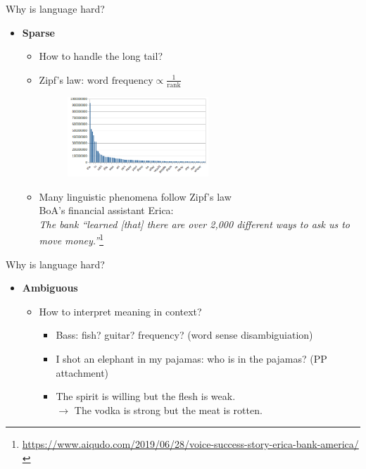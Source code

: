 \documentclass[usenames,dvipsnames,notes,11pt,aspectratio=169]{beamer}
\begin{document}
\begin{frame}
    {Why is language hard?}
    \begin{itemize}
        \item \textbf{Sparse} 
            \begin{itemize}
                \item How to handle the long tail?
                \item Zipf's law: $\text{word frequency} \propto \frac{1}{\text{rank}}$
                    \begin{figure}
                        \includegraphics[height=3cm]{figures/zipf}
                    \end{figure}
                \item Many linguistic phenomena follow Zipf's law\\
                    BoA's financial assistant Erica:\\
                    \textit{The bank ``learned [that] there are over 2,000 different ways to ask us to move money.''}\footnote[frame]{
                        \url{https://www.aiqudo.com/2019/06/28/voice-success-story-erica-bank-america/}
                    }
            \end{itemize}
    \end{itemize}
\end{frame}

\begin{frame}
    {Why is language hard?}
    \begin{itemize}
        \item \textbf{Ambiguous} 
            \begin{itemize}
                \item How to interpret meaning in context?
                \medskip
                \begin{itemize}
                    \itemsep2em
                    \item[] Bass: fish? guitar? frequency? (word sense disambiguiation)
                    \item[] I shot an elephant in my pajamas: who is in the pajamas? (PP attachment)
                    \item[] The spirit is willing but the flesh is weak.\\
                        $\rightarrow$ 
                        The vodka is strong but the meat is rotten.
                \end{itemize}
            \end{itemize}
    \end{itemize}
\end{frame}
\end{document}
